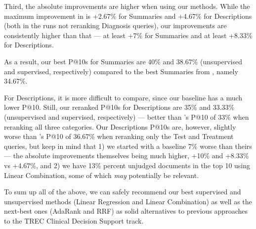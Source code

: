 Third, the absolute improvements are higher when using our methods. 
While the maximum improvement
in \cite{choi} is +2.67\% for Summaries and +4.67\% for Descriptions (both in the runs not reranking Diagnosis queries), 
our improvements are consistently
higher than that --- at least +7\% for Summaries and at least +8.33\% for Descriptions. 

As a result, our best P@10s for Summaries are 40\% and 38.67\%
(unsupervised and supervised, respectively) compared to the best Summaries from \cite{choi}, namely 34.67\%.

For Descriptions, it is more difficult to compare, since our baseline has a much lower P@10. 
Still, our reranked P@10s for Descriptions are 35\% and 33.33\% (unsupervised and supervised, respectively)
 --- better than \cite{choi}'s P@10 of 33\% when reranking all three categories. 
Our Descriptions P@10s are, however, slightly worse
than \cite{choi}'s P@10 of 36.67\% when reranking only the Test and Treatment queries, but keep in mind that
1) we started with a baseline 7\% worse than theirs --- the absolute improvements themselves being much higher, +10\% and +8.33\%
vs +4.67\%, and 2) we have 13\% percent unjudged documents in the top 10 using Linear Combination,
some of which \emph{may} potentially be relevant.

To sum up all of the above, we can safely recommend our best supervised and unsupervised methods
(Linear Regression and Linear Combination) as well as the next-best ones (AdaRank and RRF)
as solid alternatives to previous approaches to the TREC Clinical Decision Support track.






